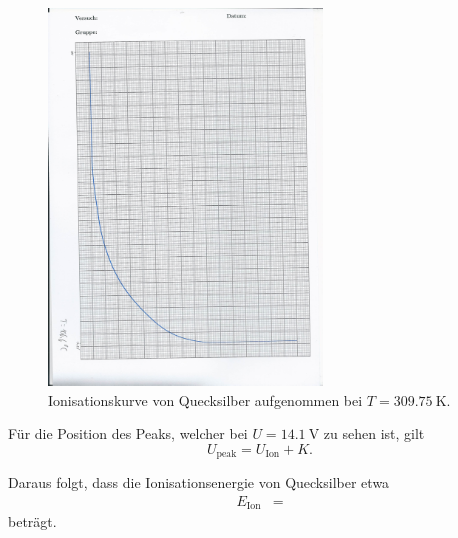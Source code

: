 \begin{figure}[H]
  \centering
  \includegraphics[height = 10cm]{messdaten/daten-5.jpg}
  \caption{Ionisationskurve von Quecksilber aufgenommen bei $T = \SI{309.75}{\kelvin}$.}
  \label{fig:abb2}
\end{figure}

Für die Position des Peaks, welcher bei $U = \SI{14.1}{\volt}$ zu sehen ist, gilt
\begin{equation}
  U_{\text{peak}} = U_{\text{Ion}} + K.
\end{equation}

Daraus folgt, dass die Ionisationsenergie von Quecksilber etwa
\begin{align*}
  E_{\text{Ion}} &= 
\end{align*}
beträgt.
